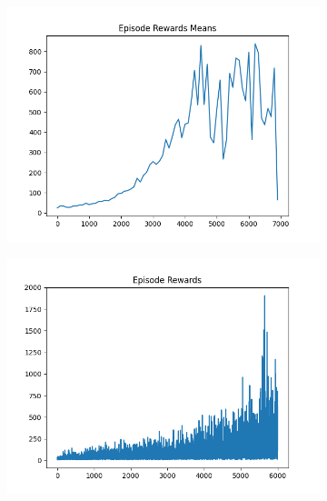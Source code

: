 \begin{figure}[H]
\begin{subfigure}{.47\linewidth}
        \includegraphics[width=\textwidth]{pole/2024-06-15_00-29-02_dqn_cartpole_episode_rewards_means.png}
    \end{subfigure}
    \begin{subfigure}{.47\linewidth}
        \centering
        \includegraphics[width=\textwidth]{pole/2024-06-14_18-05-51_dqn_cartpole_episode_rewards.png}
    \end{subfigure}
\end{figure}
